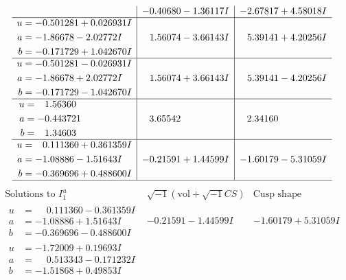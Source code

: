 \documentclass[1p]{elsarticle_modified}
\theoremstyle{definition}
\newcommand{\I}{\sqrt{-1}}
\begin{document}
$$\begin{array}{c|c|c}
 & -0.40680 - 1.36117 I & -2.67817 + 4.58018 I \\ \hline\begin{aligned}
u &= -0.501281 + 0.026931 I \\
a &= -1.86678 - 2.02772 I \\
b &= -0.171729 + 1.042670 I\end{aligned}
 & \phantom{-}1.56074 - 3.66143 I & \phantom{-}5.39141 + 4.20256 I \\ \hline\begin{aligned}
u &= -0.501281 - 0.026931 I \\
a &= -1.86678 + 2.02772 I \\
b &= -0.171729 - 1.042670 I\end{aligned}
 & \phantom{-}1.56074 + 3.66143 I & \phantom{-}5.39141 - 4.20256 I \\ \hline\begin{aligned}
u &= \phantom{-}1.56360\phantom{ +0.000000I} \\
a &= -0.443721\phantom{ +0.000000I} \\
b &= \phantom{-}1.34603\phantom{ +0.000000I}\end{aligned}
 & \phantom{-}3.65542\phantom{ +0.000000I} & \phantom{-}2.34160\phantom{ +0.000000I} \\ \hline\begin{aligned}
u &= \phantom{-}0.111360 + 0.361359 I \\
a &= -1.08886 - 1.51643 I \\
b &= -0.369696 + 0.488600 I\end{aligned}
 & -0.21591 + 1.44599 I & -1.60179 - 5.31059 I\\
 \hline 
 \end{array}$$\newpage$$\begin{array}{c|c|c}  
\text{Solutions to }I^u_{1}& \I (\text{vol} + \sqrt{-1}CS) & \text{Cusp shape}\\
 \hline 
\begin{aligned}
u &= \phantom{-}0.111360 - 0.361359 I \\
a &= -1.08886 + 1.51643 I \\
b &= -0.369696 - 0.488600 I\end{aligned}
 & -0.21591 - 1.44599 I & -1.60179 + 5.31059 I \\ \hline\begin{aligned}
u &= -1.72009 + 0.19693 I \\
a &= \phantom{-}0.513343 - 0.171232 I \\
b &= -1.51868 + 0.49853 I\end{aligned}

\end{array}$$
\end{document}
